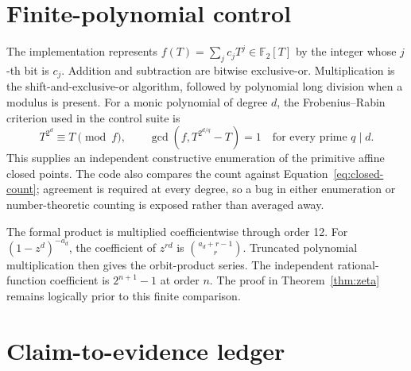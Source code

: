 \documentclass[11pt]{article}
\theoremstyle{definition}
\theoremstyle{remark}
\newcommand{\F}{\mathbb{F}}
\begin{document}
\appendix

\section{Finite-polynomial control}

The implementation represents
\(f(T)=\sum_jc_jT^j\in\F_2[T]\) by the integer whose \(j\)-th bit is \(c_j\).
Addition and subtraction are bitwise exclusive-or.  Multiplication is the
shift-and-exclusive-or algorithm, followed by polynomial long division when a
modulus is present.  For a monic polynomial of degree \(d\), the
Frobenius--Rabin criterion used in the control suite is
\[
  T^{2^d}\equiv T\pmod f,
  \qquad
  \gcd\!\left(f,T^{2^{d/q}}-T\right)=1
  \quad\text{for every prime }q\mid d.
\]
This supplies an independent constructive enumeration of the primitive
affine closed points.  The code also compares the count against
Equation~\eqref{eq:closed-count}; agreement is required at every degree, so a
bug in either enumeration or number-theoretic counting is exposed rather than
averaged away.

The formal product is multiplied coefficientwise through order 12.  For
\((1-z^d)^{-a_d}\), the coefficient of \(z^{rd}\) is
\(\binom{a_d+r-1}{r}\).  Truncated polynomial multiplication then gives the
orbit-product series.  The independent rational-function coefficient is
\(2^{n+1}-1\) at order \(n\).  The proof in
Theorem~\ref{thm:zeta} remains logically prior to this finite comparison.

\section{Claim-to-evidence ledger}
\end{document}
